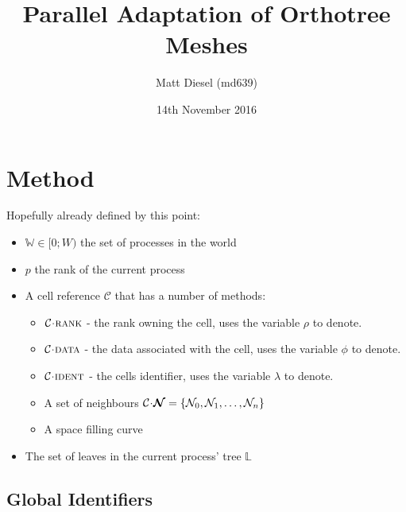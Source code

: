 \documentclass{IIBproject}
\newcommand{\vect}[1]{\bm{#1}}
\newcommand{\acc}{{\mkern 0.5mu\cdot\mkern 0.5mu}}
\begin{document}
\date{14th November 2016}
\author{Matt Diesel (md639)}
\title{Parallel Adaptation of Orthotree Meshes}



\pagestyle{plain}



\section{Method}

Hopefully already defined by this point:

\begin{itemize}
	\item $\mathbb{W} \in [0;W)$ the set of processes in the world
	\item $p$ the rank of the current process
	\item A cell reference $\mathcal{C}$ that has a number of methods:
	\begin{itemize}
		\item $\mathcal{C}\acc\textproc{rank}$ - the rank owning the cell, uses the variable $\rho$ to denote.
		\item $\mathcal{C}\acc\textproc{data}$ - the data associated with the cell, uses the variable $\phi$ to denote.
		\item $\mathcal{C}\acc\textproc{ident}$ - the cells identifier, uses the variable $\lambda$ to denote. 
		\item A set of neighbours $\mathcal{C}\acc\vect{\mathcal{N}} = \{\mathcal{N}_0 , \mathcal{N}_1, \dots , \mathcal{N}_n\}$
		\item A space filling curve
	\end{itemize}
	\item The set of leaves in the current process' tree $\mathbb{L}$
\end{itemize}


\subsection{Global Identifiers}
\end{document}
